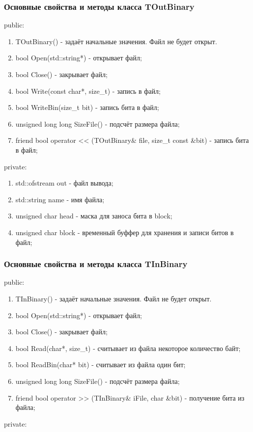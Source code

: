 \documentclass[12pt]{article}
\begin{document}
	\subsubsection*{Основные свойства и методы класса TOutBinary}
	\noindent
	public:
	
	\begin{enumerate}
		\item TOutBinary() - задаёт начальные значения. Файл не будет открыт.
		\item bool Open(std::string*) - открывает файл;
		\item bool Close() - закрывает файл;
		\item bool Write(const char*, size\_t) - запись в файл;
		\item bool WriteBin(size\_t bit) - запись бита в файл;
		\item unsigned long long SizeFile() - подсчёт размера файла;
		\item friend bool operator << (TOutBinary\& file, size\_t const \&bit) - запись бита в файл;
	\end{enumerate}
	\noindent
	private:
	
	\begin{enumerate}
		\item std::ofstream out - файл вывода;
		\item std::string name - имя файла;
		\item unsigned char head - маска для заноса бита в block;
		\item unsigned char block - временный буффер для хранения и записи битов в файл;
	\end{enumerate}
	
	\subsubsection*{Основные свойства и методы класса TInBinary}
	\noindent
	public:
	
	\begin{enumerate}
		\item TInBinary() - задаёт начальные значения. Файл не будет открыт.
		\item bool Open(std::string*) - открывает файл;
		\item bool Close() - закрывает файл;
		\item bool Read(char*, size\_t) - считывает из файла некоторое количество байт;
		\item bool ReadBin(char* bit) - считывает из файла один бит;
		\item unsigned long long SizeFile() - подсчёт размера файла;
		\item friend bool operator >> (TInBinary\& iFile, char \&bit) - получение бита из файла;
	\end{enumerate}
	\noindent
	private:
	
\end{document}
